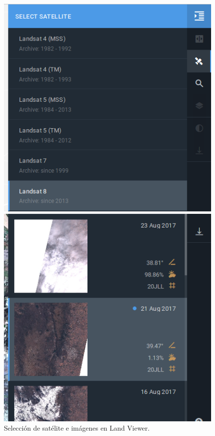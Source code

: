 \documentclass[a4paper,12pt]{book}
\begin{document}
\begin{figure}[hb!]
\centering
\begin{minipage}{.425\linewidth}
  \includegraphics[width=\linewidth]{fig:sat.png}
\end{minipage}
\hspace{.05\linewidth}
\begin{minipage}{.425\linewidth}
  \includegraphics[width=\linewidth]{fig:imagen1.png}
\end{minipage}
\caption{Selección de satélite e imágenes en Land Viewer.}
\label{fig:scene}
\end{figure}
\end{document}
